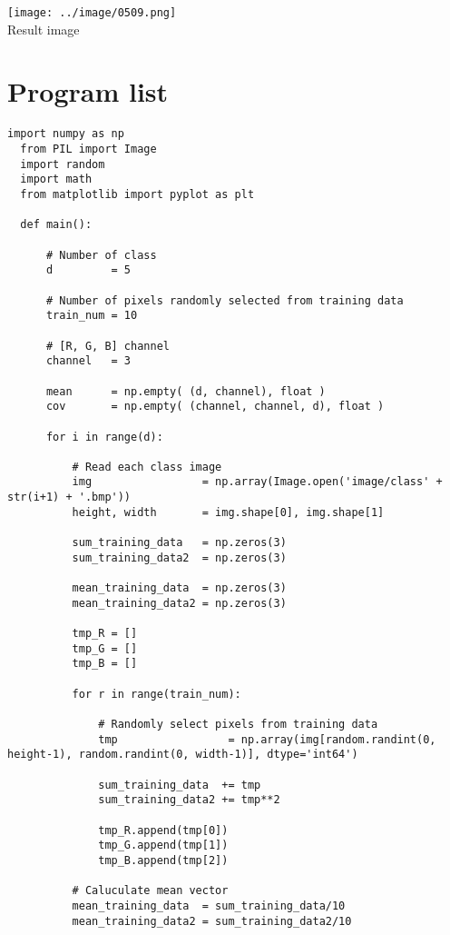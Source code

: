 \documentclass{jarticle}
\begin{document}
 \begin{center}
  \texttt{[image: ../image/0509.png]} \\
  Result image
\end{center}

\section{Program list}

\begin{lstlisting}[basicstyle=\ttfamily\footnotesize, frame=single]
  import numpy as np
  from PIL import Image
  import random
  import math
  from matplotlib import pyplot as plt
  
  def main():
  
      # Number of class
      d         = 5
  
      # Number of pixels randomly selected from training data
      train_num = 10
  
      # [R, G, B] channel
      channel   = 3
  
      mean      = np.empty( (d, channel), float )
      cov       = np.empty( (channel, channel, d), float )
  
      for i in range(d):
  
          # Read each class image
          img                 = np.array(Image.open('image/class' + str(i+1) + '.bmp'))
          height, width       = img.shape[0], img.shape[1]
  
          sum_training_data   = np.zeros(3)
          sum_training_data2  = np.zeros(3)
  
          mean_training_data  = np.zeros(3)
          mean_training_data2 = np.zeros(3)
  
          tmp_R = []
          tmp_G = []
          tmp_B = []
  
          for r in range(train_num):
  
              # Randomly select pixels from training data
              tmp                 = np.array(img[random.randint(0, height-1), random.randint(0, width-1)], dtype='int64')
  
              sum_training_data  += tmp
              sum_training_data2 += tmp**2
  
              tmp_R.append(tmp[0])
              tmp_G.append(tmp[1])
              tmp_B.append(tmp[2])
  
          # Caluculate mean vector
          mean_training_data  = sum_training_data/10
          mean_training_data2 = sum_training_data2/10
  

\end{lstlisting}
\end{document}

